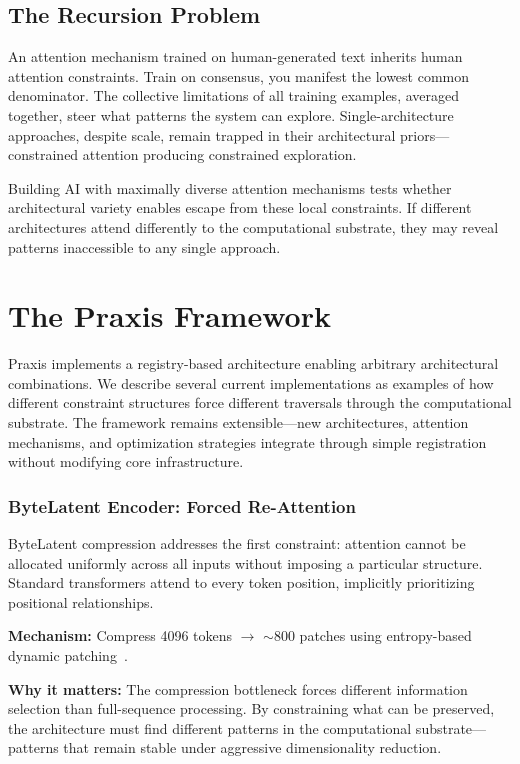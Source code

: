 \documentclass{article}
\begin{document}
\subsection{The Recursion Problem}

An attention mechanism trained on human-generated text inherits human attention constraints. Train on consensus, you manifest the lowest common denominator. The collective limitations of all training examples, averaged together, steer what patterns the system can explore. Single-architecture approaches, despite scale, remain trapped in their architectural priors—constrained attention producing constrained exploration.

Building AI with maximally diverse attention mechanisms tests whether architectural variety enables escape from these local constraints. If different architectures attend differently to the computational substrate, they may reveal patterns inaccessible to any single approach.

\section{The Praxis Framework}

Praxis implements a registry-based architecture enabling arbitrary architectural combinations. We describe several current implementations as examples of how different constraint structures force different traversals through the computational substrate. The framework remains extensible—new architectures, attention mechanisms, and optimization strategies integrate through simple registration without modifying core infrastructure.

\subsubsection{ByteLatent Encoder: Forced Re-Attention}

ByteLatent compression addresses the first constraint: attention cannot be allocated uniformly across all inputs without imposing a particular structure. Standard transformers attend to every token position, implicitly prioritizing positional relationships.

\textbf{Mechanism:} Compress 4096 tokens $\rightarrow$ $\sim$800 patches using entropy-based dynamic patching~\cite{pagnoni2024byte}.

\textbf{Why it matters:} The compression bottleneck forces different information selection than full-sequence processing. By constraining what can be preserved, the architecture must find different patterns in the computational substrate—patterns that remain stable under aggressive dimensionality reduction.
\end{document}
